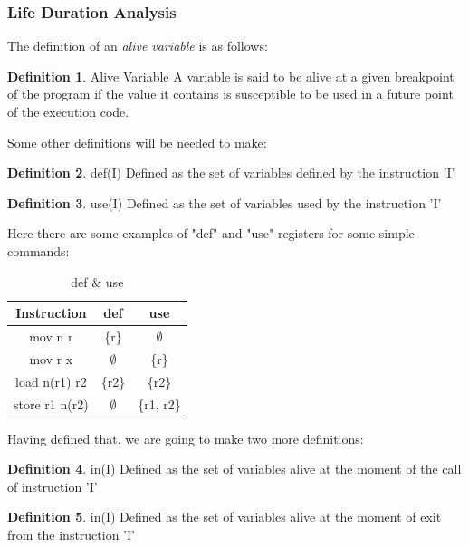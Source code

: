 \documentclass[conference]{IEEEtran}
\theoremstyle{definition}
\newtheorem{definition}{Definition}[section]
\begin{document}
\subsubsection{Life Duration Analysis}

The definition of an \textit{alive variable} is as follows:

\theoremstyle{definition}
\begin{definition}{Alive Variable}
	A variable is said to be alive at a given breakpoint of the program if the value it contains is susceptible to be used in a future point of the execution code.
\end{definition}

Some other definitions will be needed to make:

\theoremstyle{definition}
\begin{definition}{def(I)}
	Defined as the set of variables defined by the instruction 'I'
\end{definition}
\theoremstyle{definition}
\begin{definition}{use(I)}
	Defined as the set of variables used by the instruction 'I'
\end{definition}

Here there are some examples of "def" and "use" registers for some simple commands:

\begin{table}[H]
	\begin{center}
		\begin{tabular}{||c | c | c||}
			\hline
			Instruction & def & use  \\ [0.5ex] 
			\hline\hline
			mov n r & \{r\} &   $\emptyset$ \\ 
			\hline
			mov r x & $\emptyset$ & \{r\} \\
			\hline
			load n(r1) r2 & \{r2\} & \{r2\} \\
			\hline
			store r1 n(r2) & $\emptyset$ & \{r1, r2\} \\
			\hline
		\end{tabular}
	\end{center}
	\caption{def \& use} \label{tab:def-and-use}
\end{table}

Having defined that, we are going to make two more definitions:

\theoremstyle{definition}
\begin{definition}{in(I)}
	Defined as the set of variables alive at the moment of the call of instruction 'I' 
\end{definition}
\theoremstyle{definition}
\begin{definition}{in(I)}
	Defined as the set of variables alive at the moment of exit from the instruction 'I'
\end{definition}
\end{document}

